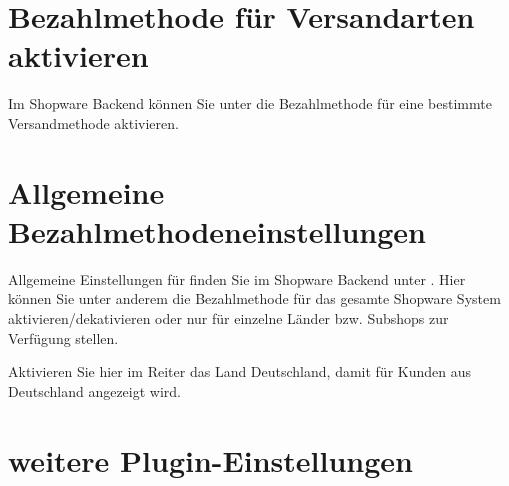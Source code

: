 \documentclass[a4paper,10pt,openany,oneside,ngerman]{sphinxmanual}
\begin{document}
\noindent{}


\section{Bezahlmethode für Versandarten aktivieren}
\label{\detokenize{configuration:bezahlmethode-fur-versandarten-aktivieren}}
Im Shopware Backend können Sie unter  die  Bezahlmethode für eine bestimmte Versandmethode aktivieren.


\section{Allgemeine Bezahlmethodeneinstellungen}
\label{\detokenize{configuration:allgemeine-bezahlmethodeneinstellungen}}
Allgemeine Einstellungen für  finden Sie im Shopware Backend unter . Hier können Sie unter anderem die Bezahlmethode für das gesamte Shopware System aktivieren/dekativieren oder nur für einzelne Länder bzw. Subshops zur Verfügung stellen.

\noindent{}

Aktivieren Sie hier im Reiter  das Land Deutschland, damit  für Kunden aus Deutschland angezeigt wird.

\noindent{}


\section{weitere Plugin-Einstellungen}
\label{\detokenize{configuration:weitere-plugin-einstellungen}}
\end{document}
